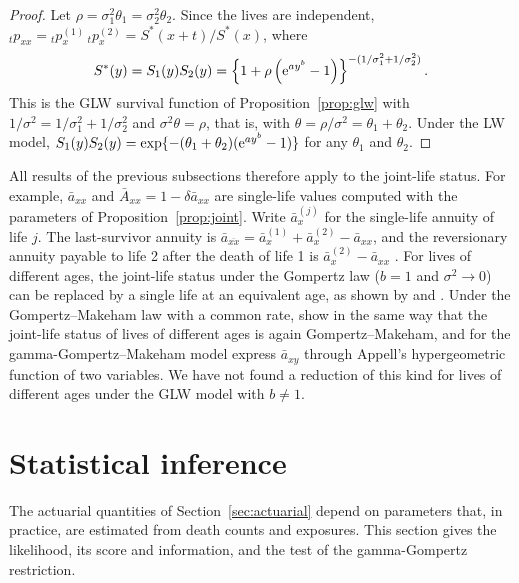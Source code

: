 \documentclass[12pt]{article}
\newcommand{\e}{{\rm e}}         %
\begin{document}
\begin{proof}
Let $\rho=\sigma_1^2\theta_1=\sigma_2^2\theta_2$. Since the lives are independent, ${}_tp_{xx}={}_tp_x^{(1)}\,{}_tp_x^{(2)}=S^\ast(x+t)/S^\ast(x)$, where
\[
S^\ast(y)=S_1(y)S_2(y)=\left\{1+\rho\left(\e^{ay^b}-1\right)\right\}^{-(1/\sigma_1^2+1/\sigma_2^2)}.
\]
This is the GLW survival function of Proposition~\ref{prop:glw} with $1/\sigma^2=1/\sigma_1^2+1/\sigma_2^2$ and $\sigma^2\theta=\rho$, that is, with $\theta=\rho/\sigma^2=\theta_1+\theta_2$. Under the LW model, $S_1(y)S_2(y)=\exp\{-(\theta_1+\theta_2)(\e^{ay^b}-1)\}$ for any $\theta_1$ and $\theta_2$.
\end{proof}

All results of the previous subsections therefore apply to the joint-life status. For example, $\bar{a}_{xx}$ and $\bar{A}_{xx}=1-\delta\bar{a}_{xx}$ are single-life values computed with the parameters of Proposition~\ref{prop:joint}. Write $\bar{a}^{(j)}_x$ for the single-life annuity of life $j$. The last-survivor annuity is $\bar{a}_{\overline{xx}}=\bar{a}^{(1)}_x+\bar{a}^{(2)}_x-\bar{a}_{xx}$, and the reversionary annuity payable to life 2 after the death of life 1 is $\bar{a}^{(2)}_x-\bar{a}_{xx}$ \citep[Chapter~13]{jordan1967life}. For lives of different ages, the joint-life status under the Gompertz law ($b=1$ and $\sigma^2\to0$) can be replaced by a single life at an equivalent age, as shown by \citet[Section~9.6]{jordan1967life} and \citet[Section~7.2]{neill1977life}. Under the Gompertz--Makeham law with a common rate, \citet[Lemma~3]{castellares2022gompertz} show in the same way that the joint-life status of lives of different ages is again Gompertz--Makeham, and for the gamma-Gompertz--Makeham model \citet[Proposition~8]{castellares2024gamma} express $\bar{a}_{xy}$ through Appell's hypergeometric function of two variables. We have not found a reduction of this kind for lives of different ages under the GLW model with $b\neq1$.


\section{Statistical inference}\label{sec:inference}

The actuarial quantities of Section~\ref{sec:actuarial} depend on parameters that, in practice, are estimated from death counts and exposures. This section gives the likelihood, its score and information, and the test of the gamma-Gompertz restriction.
\end{document}
